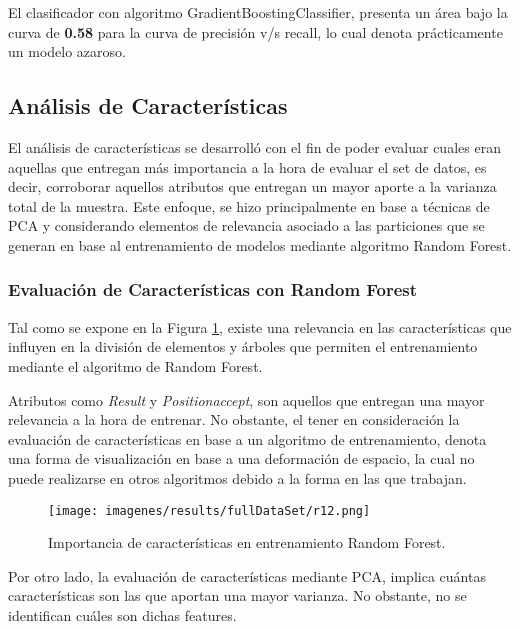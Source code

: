 El clasificador con algoritmo GradientBoostingClassifier, presenta un \'area bajo la curva de \textbf{0.58} para la curva de precisi\'on v/s recall, lo cual denota pr\'acticamente un modelo azaroso.

\subsection{An\'alisis de Caracter\'isticas}

El an\'alisis de caracter\'isticas se desarroll\'o con el fin de poder evaluar cuales eran aquellas que entregan m\'as importancia a la hora de evaluar el set de datos, es decir, corroborar aquellos atributos que entregan un mayor aporte a la varianza total de la muestra. Este enfoque, se hizo principalmente en base a t\'ecnicas de PCA y considerando elementos de relevancia asociado a las particiones que se generan en base al entrenamiento de modelos mediante algoritmo Random Forest.

\subsubsection{Evaluaci\'on de Caracter\'isticas con Random Forest}

Tal como se expone en la Figura \ref{car1}, existe una relevancia en las caracter\'isticas que influyen en la divisi\'on de elementos y \'arboles que permiten el entrenamiento mediante el algoritmo de Random Forest. 

Atributos como \textit{Result} y \textit{Positionaccept}, son aquellos que entregan una mayor relevancia a la hora de entrenar. No obstante, el tener en consideraci\'on la evaluaci\'on de caracter\'isticas en base a un algoritmo de entrenamiento, denota una forma de visualizaci\'on en base a una deformaci\'on de espacio, la cual no puede realizarse en otros algoritmos debido a la forma en las que trabajan.

\begin{figure}[!h]
	
	\centering
	\texttt{[image: imagenes/results/fullDataSet/r12.png]}
	\caption{Importancia de caracter\'isticas en entrenamiento Random Forest.}
	\label{car1}
\end{figure}

Por otro lado, la evaluaci\'on de caracter\'isticas mediante PCA, implica cu\'antas caracter\'isticas son las que aportan una mayor varianza. No obstante, no se identifican cu\'ales son dichas features. 

